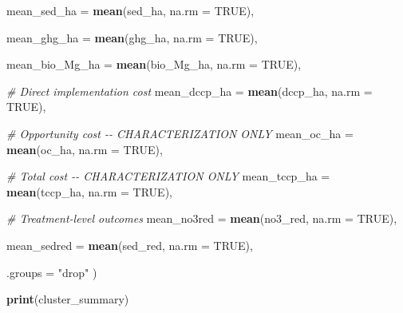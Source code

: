\documentclass[
]{article}
\newenvironment{Shaded}{\begin{snugshade}}{\end{snugshade}}
\newcommand{\AttributeTok}[1]{\textcolor[rgb]{0.13,0.29,0.53}{#1}}
\newcommand{\CommentTok}[1]{\textcolor[rgb]{0.56,0.35,0.01}{\textit{#1}}}
\newcommand{\ConstantTok}[1]{\textcolor[rgb]{0.56,0.35,0.01}{#1}}
\newcommand{\FunctionTok}[1]{\textcolor[rgb]{0.13,0.29,0.53}{\textbf{#1}}}
\newcommand{\NormalTok}[1]{#1}
\newcommand{\StringTok}[1]{\textcolor[rgb]{0.31,0.60,0.02}{#1}}
\begin{document}
\begin{Shaded}
\begin{Highlighting}[]
    \AttributeTok{mean\_sed\_ha =}
      \FunctionTok{mean}\NormalTok{(sed\_ha, }\AttributeTok{na.rm =} \ConstantTok{TRUE}\NormalTok{),}

    \AttributeTok{mean\_ghg\_ha =}
      \FunctionTok{mean}\NormalTok{(ghg\_ha, }\AttributeTok{na.rm =} \ConstantTok{TRUE}\NormalTok{),}

    \AttributeTok{mean\_bio\_Mg\_ha =}
      \FunctionTok{mean}\NormalTok{(bio\_Mg\_ha, }\AttributeTok{na.rm =} \ConstantTok{TRUE}\NormalTok{),}

    \CommentTok{\# Direct implementation cost}
    \AttributeTok{mean\_dccp\_ha =}
      \FunctionTok{mean}\NormalTok{(dccp\_ha, }\AttributeTok{na.rm =} \ConstantTok{TRUE}\NormalTok{),}

    \CommentTok{\# Opportunity cost {-}{-} CHARACTERIZATION ONLY}
    \AttributeTok{mean\_oc\_ha =}
      \FunctionTok{mean}\NormalTok{(oc\_ha, }\AttributeTok{na.rm =} \ConstantTok{TRUE}\NormalTok{),}

    \CommentTok{\# Total cost {-}{-} CHARACTERIZATION ONLY}
    \AttributeTok{mean\_tccp\_ha =}
      \FunctionTok{mean}\NormalTok{(tccp\_ha, }\AttributeTok{na.rm =} \ConstantTok{TRUE}\NormalTok{),}

    \CommentTok{\# Treatment{-}level outcomes}
    \AttributeTok{mean\_no3red =}
      \FunctionTok{mean}\NormalTok{(no3\_red, }\AttributeTok{na.rm =} \ConstantTok{TRUE}\NormalTok{),}

    \AttributeTok{mean\_sedred =}
      \FunctionTok{mean}\NormalTok{(sed\_red, }\AttributeTok{na.rm =} \ConstantTok{TRUE}\NormalTok{),}

    \AttributeTok{.groups =} \StringTok{"drop"}
\NormalTok{  )}

\FunctionTok{print}\NormalTok{(cluster\_summary)}
\end{Highlighting}
\end{Shaded}
\end{document}
